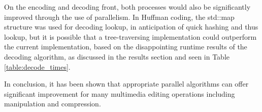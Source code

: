 \documentclass[10pt,twocolumn,twoside]{IEEEtran}
\begin{document}
On the encoding and decoding front, both processes would also be significantly improved through the use of parallelism. In Huffman coding, the std::map structure was used for decoding lookup, in anticipation of quick hashing and thus lookup, but it is possible that a tree-traversing implementation could outperform the current implementation, based on the disappointing runtime results of the decoding algorithm, as discussed in the results section and seen in Table \ref{table:decode_times}. 

In conclusion, it has been shown that appropriate parallel algorithms can offer significant improvement for many multimedia editing operations including manipulation and compression.

\nocite{*}


\end{document}
